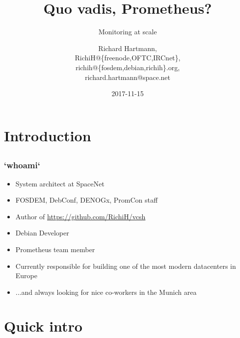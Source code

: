 \documentclass[t]{beamer}
\title{Quo vadis, Prometheus?}
\subtitle{Monitoring at scale}
\author{Richard Hartmann,\\
RichiH@\{freenode,OFTC,IRCnet\},\\
richih@\{fosdem,debian,richih\}.org,\\
richard.hartmann@space.net}
\date{2017-11-15}
\begin{document}
\setcounter{tocdepth}{1}

\section{Introduction}

\subsection{}

\begin{frame}
	\titlepage
\end{frame}


\subsection{}

\begin{frame}
	\frametitle{`whoami`}
	\begin{itemize}
		\item System architect at SpaceNet
		\item FOSDEM, DebConf, DENOGx, PromCon staff
		\item Author of \url{https://github.com/RichiH/vcsh}
		\item Debian Developer
		\item Prometheus team member
		\item Currently responsible for building one of the most modern datacenters in Europe
		\item ...and always looking for nice co-workers in the Munich area
	\end{itemize}
\end{frame}


\section{Quick intro}

\subsection{}

\end{document}
